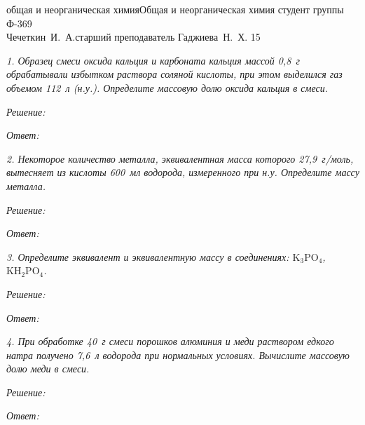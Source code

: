 






{общая и неорганическая химия}{Общая и неорганическая химия}
{студент группы Ф-369\\Чечеткин~И.~А.}{старший преподаватель Гаджиева~Н.~Х.}
{}{15}

\emph{1. Образец смеси оксида кальция и карбоната кальция массой 0,8~г
обрабатывали избытком раствора соляной кислоты, при этом выделился газ объемом
112~л (н.у.). Определите массовую долю оксида кальция в смеси.}

\vspace*{2em}
\emph{Решение:}

\vspace*{2em}
\emph{Ответ: }


\emph{2. Некоторое количество металла, эквивалентная масса которого
27,9~г/моль, вытесняет из кислоты 600~мл водорода, измеренного при н.у.
Определите массу металла.}

\vspace*{2em}
\emph{Решение:}

\vspace*{2em}
\emph{Ответ: }


\emph{3. Определите эквивалент и эквивалентную массу в соединениях:
\( \mathrm{K_3PO_4} \), \( \mathrm{KH_2PO_4} \).}

\vspace*{2em}
\emph{Решение:}

\vspace*{2em}
\emph{Ответ: }


\emph{4. При обработке 40~г смеси порошков алюминия и меди раствором едкого
натра получено 7,6~л водорода при нормальных условиях. Вычислите массовую долю
меди в смеси.}

\vspace*{2em}
\emph{Решение:}

\vspace*{2em}
\emph{Ответ: }


